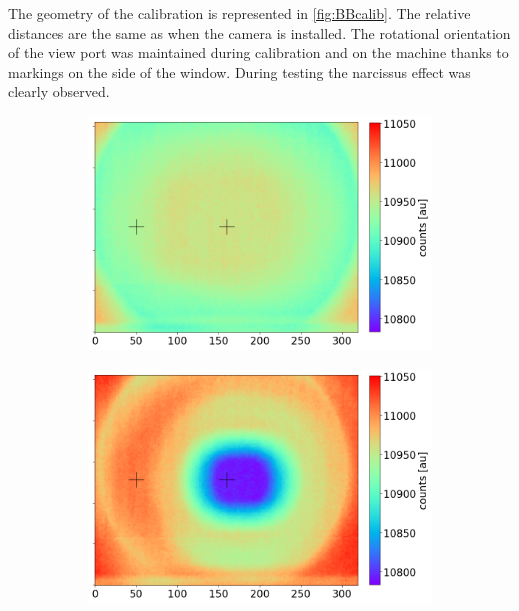 The geometry of the calibration is represented in \autoref{fig:BBcalib}. The relative distances are the same as when the camera is installed. The rotational orientation of the view port was maintained during calibration and on the machine thanks to markings on the side of the window. During testing the narcissus effect was clearly observed.

\begin{figure}
     \centering
     \begin{subfigure}{0.435\linewidth}
         \centering
         \includegraphics[trim={5 0 130 5},clip,width=\linewidth]{Chapters/chapter2/figs/NUC_calib2.png}
         \caption{}
         \label{NUC_calib2}
     \end{subfigure}
     \begin{subfigure}{0.535\linewidth}
         \centering
         \includegraphics[trim={5 0 5 5},clip,width=\linewidth]{Chapters/chapter2/figs/NUC_calib1.png}

\end{subfigure}
\end{figure}
